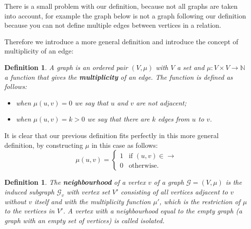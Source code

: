 \documentclass[a4paper,11pt]{report}
\newtheorem{definition}[theorem]{Definition}
\newcommand{\N}{{\mathbb N}}
\newcommand{\graf}{\mathscr{G}}
\begin{document}
There is a small problem with our definition, because not all graphs are taken 
into account, for example the  graph below is not a graph following our definition 
because you can not define multiple edges between vertices in a relation. 

  \begin{center}
\end{center}




Therefore we introduce a more general definition and introduce the concept of 
multiplicity of an edge:

\begin{definition}
  A graph is an ordered pair $(V, \mu)$ with $V$ a set and $\mu: V \times V \to \N$ a function that gives the \textbf{multiplicity} of an edge.
  The function is defined as follows:
  \begin{itemize}
    \item when $\mu(u, v) = 0$ we say that $u$ and $v$ are not adjacent;
    \item when $\mu(u, v) = k > 0$ we say that there are $k$ edges from $u$ to 
    $v$.
  \end{itemize} 
\end{definition}
It is clear that our previous definition fits perfectly in this more general definition, by constructing $\mu$ in this case as follows:
$$\mu(u,v)= \begin{cases} 1 &\mbox{if } (u,v) \in \to \\ 
0 & \mbox{otherwise}. \end{cases}$$ 
 \begin{definition}
  The \textbf{neighbourhood} of a vertex $v$ of a graph $\graf=(V,\mu)$ is the induced subgraph $\graf_v$ 
 with vertex set $V'$ consisting of all vertices adjacent to $v$ without $v$ itself and with the multiplicity function $\mu'$,
 which is the restriction of $\mu$ to the vertices in $V'$.
 A vertex with a neighbourhood equal to the empty graph (a graph with an empty set of vertices) is called 
 \emph{isolated}.
\end{definition}  
  
\end{document}
